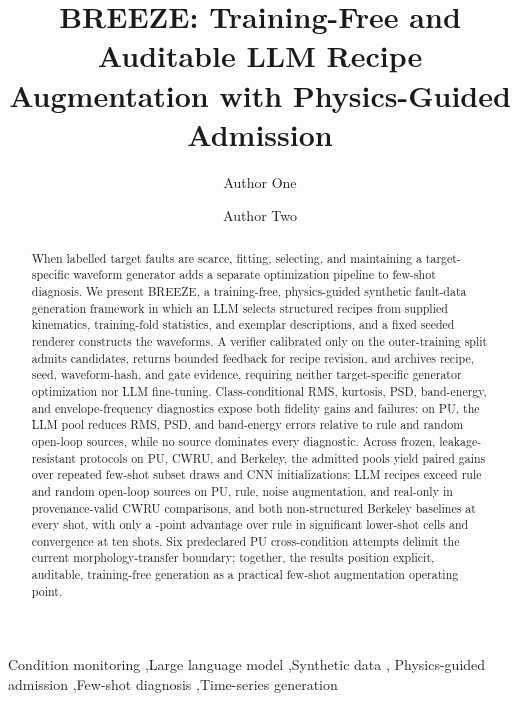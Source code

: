 \documentclass[a4paper,fleqn]{cas-sc}
\newcommand{\breeze}{BREEZE}
\begin{document}
\let\WriteBookmarks\relax
\def\floatpagepagefraction{1}
\def\textpagefraction{.001}


\title[mode=title]{\breeze: Training-Free and Auditable LLM Recipe
Augmentation with Physics-Guided Admission}

\author[1]{Author One}
\author[1]{Author Two}


\begin{abstract}
When labelled target faults are scarce, fitting, selecting, and maintaining a
target-specific waveform generator adds a separate optimization pipeline to
few-shot diagnosis. We present \breeze, a training-free, physics-guided
synthetic fault-data generation framework in which an LLM selects structured
recipes from supplied kinematics, training-fold statistics, and exemplar
descriptions, and a fixed seeded renderer constructs the waveforms. A verifier
calibrated only on the outer-training split admits candidates, returns bounded
feedback for recipe revision, and archives recipe, seed, waveform-hash, and
gate evidence, requiring neither target-specific generator optimization nor
LLM fine-tuning. Class-conditional RMS, kurtosis, PSD, band-energy, and
envelope-frequency diagnostics expose both fidelity gains and failures: on PU,
the LLM pool reduces RMS, PSD, and band-energy errors relative to rule and
random open-loop sources, while no source dominates every diagnostic. Across
frozen, leakage-resistant protocols on PU, CWRU, and Berkeley, the admitted
pools yield paired gains over repeated few-shot subset draws and
CNN initializations: LLM recipes exceed rule and random open-loop sources on
PU, rule, noise augmentation, and real-only in provenance-valid CWRU
comparisons, and both non-structured Berkeley baselines at every shot, with
only a
\BreezeBerkeleyLowShotRuleEffectRange{}-point advantage over rule in
significant lower-shot cells and convergence at ten shots. Six predeclared PU
cross-condition attempts delimit the current morphology-transfer boundary;
together, the results position explicit, auditable, training-free generation
as a practical few-shot augmentation operating point.
\end{abstract}

\begin{keywords}
Condition monitoring \sep Large language model \sep Synthetic data \sep
Physics-guided admission \sep Few-shot diagnosis \sep Time-series generation
\end{keywords}
\end{document}
